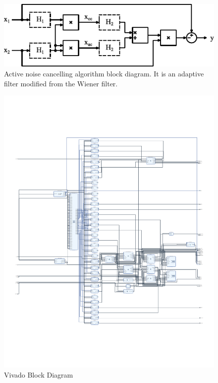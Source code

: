 \begin{figure}[htbp]
\centerline{\includegraphics[width=1\linewidth]{4-ANC_Sys/DSP.pdf}}
\caption{Active noise cancelling algorithm block diagram.  It is an adaptive filter modified from the Wiener filter.}
\label{fig_DSP}
\end{figure}

\begin{figure}[htbp]
\centerline{\includegraphics[width=0.99\linewidth]{4-ANC_Sys/VivadoBD.pdf}}
\caption{Vivado Block Diagram}
\label{fig_VivadoBD}
\end{figure}